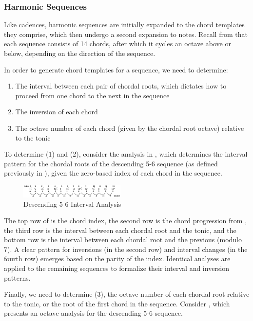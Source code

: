 \documentclass{article}
\begin{document}
\subsubsection{Harmonic Sequences}
Like cadences, harmonic sequences are initially expanded to the chord templates they comprise, which then undergo a second expansion to notes. Recall from  that each sequence consists of 14 chords, after which it cycles an octave above or below, depending on the direction of the sequence.

In order to generate chord templates for a sequence, we need to determine:

\begin{enumerate}
\itemsep0pt 
\item The interval between each pair of chordal roots, which dictates how to proceed from one chord to the next in the sequence
\item The inversion of each chord
\item The octave number of each chord (given by the chordal root octave) relative to the tonic
\end{enumerate}


To determine (1) and (2), consider the analysis in , which determines the interval pattern for the chordal roots of the descending 5-6 sequence (as defined previously in ), given the zero-based index of each chord in the sequence.


\begin{figure}[!htbp]
\centering
\includegraphics[width=0.47\textwidth]{images/desc_56_intervals}
  \caption{Descending 5-6 Interval Analysis}\label{fig:desc_56_intervals}
\end{figure}


The top row of  is the chord index, the second row is the chord progression from , the third row is the interval between each chordal root and the tonic, and the bottom row is the interval between each chordal root and the previous (modulo 7). A clear pattern for inversions (in the second row) and interval changes (in the fourth row) emerges based on the parity of the index. Identical analyses are applied to the remaining sequences to formalize their interval and inversion patterns.

Finally, we need to determine (3), the octave number of each chordal root relative to the tonic, or the root of the first chord in the sequence. Consider , which presents an octave analysis for the descending 5-6 sequence.
\end{document}
